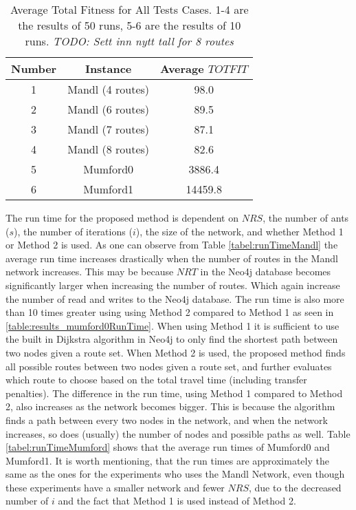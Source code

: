 \begin{table}[H]
    \centering
    \hspace*{-1.0cm}
    \begin{tabular}{|c|c|c|}
        \hline
        \textbf{Number} & \textbf{Instance} & \textbf{Average $TOTFIT$}\\
        \hline
        1 & Mandl (4 routes) & 98.0\\
        \hline
        2 & Mandl (6 routes) & 89.5\\
        \hline
        3 & Mandl (7 routes) & 87.1\\
        \hline
        4 & Mandl (8 routes) & 82.6\\
        \hline
        5 & Mumford0 & 3886.4\\
        \hline
        6 & Mumford1 & 14459.8\\
        \hline
    \end{tabular}
    \caption{Average Total Fitness for All Tests Cases. 1-4 are the results of 50 runs, 5-6 are the results of 10 runs. \emph{\color{blue} TODO: Sett inn nytt tall for 8 routes}}
    \label{tabel:averageTotfitAllTestCases}
\end{table}
 
The run time for the proposed method is dependent on $NRS$, the number of ants ($s$), the number of iterations ($i$), the size of the network, and whether Method 1 or Method 2 is used. As one can observe from Table \vref{tabel:runTimeMandl} the average run time increases drastically when the number of routes in the Mandl network increases. This may be because $NRT$ in the Neo4j database becomes significantly larger when increasing the number of routes. Which again increase the number of read and writes to the Neo4j database. The run time is also more than 10 times greater using using Method 2 compared to Method 1 as seen in \vref{table:results_mumford0RunTime}. When using Method 1 it is sufficient to use the built in Dijkstra algorithm in Neo4j to only find the shortest path between two nodes given a route set. When Method 2 is used, the proposed method finds all possible routes between two nodes given a route set, and further evaluates which route to choose based on the total travel time (including transfer penalties). The difference in the run time, using Method 1 compared to Method 2, also increases as the network becomes bigger. This is because the algorithm finds a path between every two nodes in the network, and when the network increases, so does (usually) the number of nodes and possible paths as well. Table \vref{tabel:runTimeMumford} shows that the average run times of Mumford0 and Mumford1. It is worth mentioning, that the run times are approximately the same as the ones for the experiments who uses the Mandl Network, even though these experiments have a smaller network and fewer $NRS$, due to the decreased number of $i$ and the fact that Method 1 is used instead of Method 2. 

